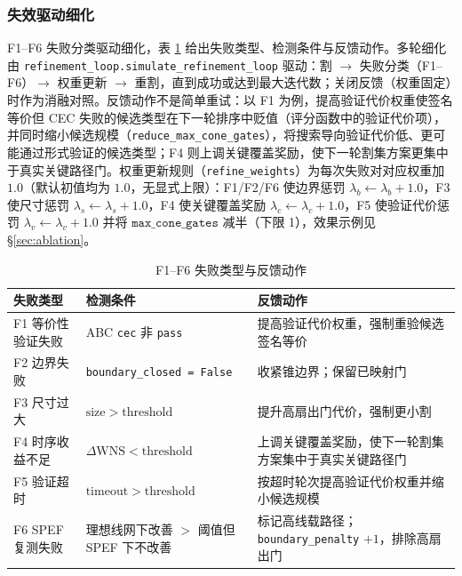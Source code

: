 \documentclass[journal]{IEEEtran}
\begin{document}
\subsubsection{失效驱动细化}
F1--F6 失败分类驱动细化，表 \ref{tab:failures} 给出失败类型、检测条件与反馈动作。多轮细化由 \texttt{refinement\_loop.simulate\_refinement\_loop} 驱动：割 $\rightarrow$ 失败分类（F1--F6）$\rightarrow$ 权重更新 $\rightarrow$ 重割，直到成功或达到最大迭代数；关闭反馈（权重固定）时作为消融对照。反馈动作不是简单重试：以 F1 为例，提高验证代价权重使签名等价但 CEC 失败的候选类型在下一轮排序中贬值（评分函数中的验证代价项），并同时缩小候选规模（\texttt{reduce\_max\_cone\_gates}），将搜索导向验证代价低、更可能通过形式验证的候选类型；F4 则上调关键覆盖奖励，使下一轮割集方案更集中于真实关键路径门。权重更新规则（\texttt{refine\_weights}）为每次失败对对应权重加 $1.0$（默认初值均为 $1.0$，无显式上限）：F1/F2/F6 使边界惩罚 $\lambda_b\leftarrow\lambda_b+1.0$，F3 使尺寸惩罚 $\lambda_s\leftarrow\lambda_s+1.0$，F4 使关键覆盖奖励 $\lambda_c\leftarrow\lambda_c+1.0$，F5 使验证代价惩罚 $\lambda_v\leftarrow\lambda_v+1.0$ 并将 $\texttt{max\_cone\_gates}$ 减半（下限 1），效果示例见 \S\ref{sec:ablation}。

\begin{table}[!t]
\centering
\caption{F1--F6 失败类型与反馈动作}
\label{tab:failures}
\scriptsize
\setlength{\tabcolsep}{2pt}
\begin{tabular}{p{2.0cm}p{3.2cm}p{2.9cm}}
\toprule
\textbf{失败类型} & \textbf{检测条件} & \textbf{反馈动作} \\
\midrule
F1 等价性验证失败 & ABC \texttt{cec} 非 \texttt{pass} & 提高验证代价权重，强制重验候选签名等价 \\
F2 边界失败 & \texttt{boundary\_closed = False} & 收紧锥边界；保留已映射门 \\
F3 尺寸过大 & $\mathrm{size} > \mathrm{threshold}$ & 提升高扇出门代价，强制更小割 \\
F4 时序收益不足 & $\Delta\mathrm{WNS} < \mathrm{threshold}$ & 上调关键覆盖奖励，使下一轮割集方案集中于真实关键路径门 \\
F5 验证超时 & $\mathrm{timeout} > \mathrm{threshold}$ & 按超时轮次提高验证代价权重并缩小候选规模 \\
F6 SPEF 复测失败 & 理想线网下改善 $>$ 阈值但 SPEF 下不改善 & 标记高线载路径；\texttt{boundary\_penalty} $+1$，排除高扇出门 \\
\bottomrule
\end{tabular}
\end{table}
\end{document}
